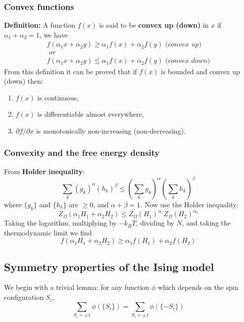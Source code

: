 \documentclass[12pt,titlepage]{article}
\numberwithin{equation}{section}
\begin{document}
\subsubsection{Convex functions}
\textbf{Definition:} A function $f(x)$ is said to be \textbf{convex up (down)} in $x$ if $\alpha_1+\alpha_2=1$, we have
\begin{equation}
    \begin{split}
        f(\alpha_1x+\alpha_2y)\geqslant\alpha_1f(x)+\alpha_2f(y)\textit{ (convex up)}\\
        \textit{ or}\\
        f(\alpha_1x+\alpha_2y)\leqslant\alpha_1f(x)+\alpha_2f(y)\textit{ (convex down)}
    \end{split}
\end{equation}
From this definition it can be proved that if $f(x)$ is bounded and convex up (down) then:
\renewcommand{\labelenumi}{(\roman{enumi})}
\begin{enumerate}
    \item $f(x)$ is continuous,
    \item $f(x)$ is differentiable almost everywhere,
    \item $\partial f/\partial x$ is monotonically non-increasing (non-decreasing).
\end{enumerate}

\subsubsection{Convexity and the free energy density}
From \textbf{Holder inequality}:
\begin{equation}
    \sum_k(g_k)^{\alpha}(h_k)^{\beta}\leqslant(\sum_kg_k)^{\alpha}(\sum_kh_k)^{\beta}
\end{equation}
where $\{g_k\}$ and $\{h_k\}$ are $\geqslant0$, and $\alpha+\beta=1$. Now use the Holder inequality:
\begin{equation}
    Z_{\Omega}(\alpha_1H_1+\alpha_2H_2)\leqslant Z_{\Omega}(H_1)^{\alpha_1}Z_{\Omega}(H_2)^{\alpha_2}
\end{equation}
Taking the logarithm, multiplying by $-k_BT$, dividing by $N$, and taking the thermodynamic limit we find
\begin{equation}
    f(\alpha_1H_1+\alpha_2H_2)\geqslant \alpha_1f(H_1)+\alpha_2f(H_2)
\end{equation}
\subsection{Symmetry properties of the Ising model}
We begin with a trivial lemma: for any function $\phi$ which depends on the spin configuration ${S_i}$,
\begin{equation}
\label{firstlemma}
    \sum_{S_i=\pm 1}\phi(\{S_i\})=\sum_{S_i=\pm1}\phi(\{-S_i\})
\end{equation}
\end{document}
